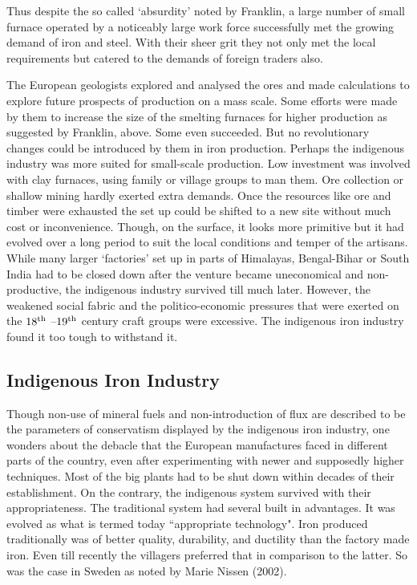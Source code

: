 Thus despite the so called `absurdity' noted by Franklin, a large number of small furnace operated by a noticeably large work force successfully met the growing demand of iron and steel. With their sheer grit they not only met the local requirements but catered to the demands of foreign traders also.

The European geologists explored and analysed the ores and made calculations to explore future prospects of production on a mass scale. Some efforts were made by them to increase the size of the smelting furnaces for higher production as suggested by Franklin, above. Some even succeeded. But no revolutionary changes could be introduced by them in iron production. Perhaps the indigenous industry was more suited for small-scale production. Low investment was involved with clay furnaces, using family or village groups to man them. Ore collection or shallow mining hardly exerted extra demands. Once the resources like ore and timber were exhausted the set up could be shifted to a new site without much cost or inconvenience. Though, on the surface, it looks more primitive but it had evolved over a long period to suit the local conditions and temper of the artisans. While many larger ‘factories’ set up in parts of Himalayas, Bengal-Bihar or South India had to be closed down after the venture became uneconomical and non-productive, the indigenous industry survived till much later. However, the weakened social fabric and the politico-economic pressures that were exerted on the $18^{\rm th}$ –$19^{\rm th}$ century craft groups were excessive.  The indigenous iron industry found it too tough to withstand it. 

\vspace{-.3cm}

\subsection*{Indigenous Iron Industry}\label{chapter8-subsection-6}

\vspace{-.2cm}

Though non-use of mineral fuels and non-introduction of flux are described to be the parameters of conservatism displayed by the indigenous iron industry, one wonders about the debacle that the European manufactures faced in different parts of the country, even after experimenting with newer and supposedly higher techniques. Most of the big plants had to be shut down within decades of their establishment. On the contrary, the indigenous system survived with their appropriateness. The traditional system had several built in advantages. It was evolved as what is termed today ``appropriate technology". Iron produced traditionally was of better quality, durability, and ductility than the factory made iron. Even till recently the villagers preferred that in comparison to the latter. So was the case in Sweden as noted by Marie Nissen (2002).


